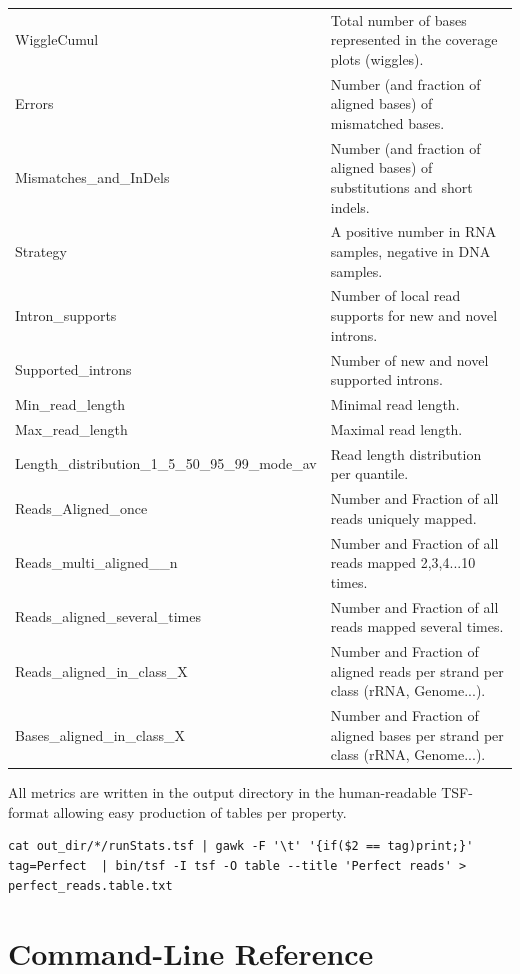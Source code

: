 \documentclass[11pt]{article}
\begin{document}
\begin{center}
\begin{longtable}{p{4.5cm} p{9cm}}
WiggleCumul  & Total number of bases represented in the coverage plots (wiggles). \\
Errors & Number (and fraction of aligned bases) of mismatched bases. \\
Mismatches\_and\_InDels & Number (and fraction of aligned bases) of substitutions and short indels. \\
Strategy   & A positive number in RNA samples, negative in DNA samples. \\ 
Intron\_supports & Number of local read supports for new and novel introns. \\
Supported\_introns & Number of new and novel supported introns.\\
Min\_read\_length & Minimal read length. \\
Max\_read\_length & Maximal read length. \\
Length\_distribution\_1\_5\_50\_95\_99\_mode\_av  & Read length distribution per quantile. \\
Reads\_Aligned\_once & Number and Fraction of all reads uniquely mapped. \\
Reads\_multi\_aligned\_\_n & Number and Fraction of all reads mapped 2,3,4...10 times. \\
Reads\_aligned\_several\_times & Number and Fraction of all reads mapped several times. \\
Reads\_aligned\_in\_class\_X & Number and Fraction of aligned reads per strand per class (rRNA, Genome...). \\
Bases\_aligned\_in\_class\_X & Number and Fraction of aligned bases per strand per class (rRNA, Genome...). \\
\bottomrule
\end{longtable}
\end{center}

All metrics are written in the output directory
in the human-readable TSF-format
allowing easy production of tables per property.

\begin{lstlisting}
cat out_dir/*/runStats.tsf | gawk -F '\t' '{if($2 == tag)print;}' tag=Perfect  | bin/tsf -I tsf -O table --title 'Perfect reads' > perfect_reads.table.txt
\end{lstlisting}


\section{Command-Line Reference}
\label{sec:cmdref}
\end{document}
